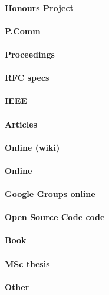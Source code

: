 \documentclass[
    a4paper,
    12pt
]{extreport}
\begin{document}
\paragraph{Honours Project}
\cite{casper2017}

\paragraph{P.Comm}
\cite{slack7Nov}
\cite{slack2Nov}

\paragraph{Proceedings}
\cite{cap}

\paragraph{RFC specs}
\cite{rfc7159}

\paragraph{IEEE}
\cite{floatingPoint}

\paragraph{Articles}
\cite{google2010}
\cite{bakerEdMiningSummary}
\cite{Dimitris}

\paragraph{Online (wiki)}
\cite{hadoopPower:2017}

\paragraph{Online}
\cite{mozillaGenerators}

\paragraph{Google Groups online}
\cite{googleCon2017}

\paragraph{Open Source Code code}
\cite{csvParse}

\paragraph{Book}
\cite{mining2011}

\paragraph{MSc thesis}
\cite{chandar2010}


\paragraph{Other}
\nocite{*}

\printbibliography[title=References]

\end{document}
